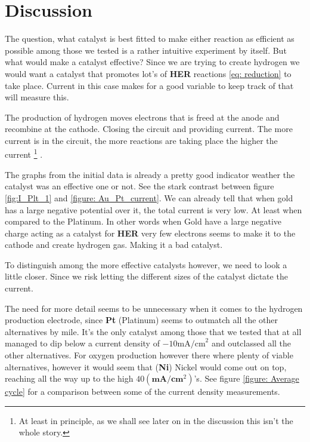 \documentclass[twocolumn, floatfix]{revtex4-2}
\begin{document}
\section{Discussion} 

The question, what catalyst is best fitted to make either reaction as efficient as 
possible among those we tested is a rather intuitive experiment by itself. But what 
would make a catalyst effective? Since we are trying to create hydrogen we would want a 
catalyst that promotes lot's of \textbf{HER} reactions \ref{eq: reduction} to take place. Current
in this case makes for a good variable to keep track of that will measure this. 
\par 
The production of hydrogen moves electrons that is freed at the anode and recombine
at the cathode. Closing the circuit and providing current. The more current is in the 
circuit, the more reactions are taking place the higher the current
\footnote{At least in principle, as we shall see later on in the discussion this isn't 
the whole story.}
.


The 
graphs from the initial data is already a pretty good indicator weather the catalyst
was an effective one or not. See the stark contrast between figure \ref{fig:I_Plt_1} and 
\ref{figure: Au_Pt_current}. We can already tell that when gold has a large negative 
potential over it, the total current is very low. At least when compared to the Platinum.
In other words when Gold have a large negative charge acting as a catalyst for \textbf{HER}
very few electrons seems to make it to the cathode and create hydrogen gas. Making it a 
bad catalyst. 
\par
To distinguish among the more effective catalysts however,
we need to look a little closer. Since we risk letting the different sizes 
of the catalyst dictate the current.
\par 
The need for more detail seems to be unnecessary when it comes to the hydrogen production
electrode, since \textbf{Pt} (Platinum) seems to outmatch all the other alternatives by mile.
It's the only catalyst among those that we tested that at all managed to dip below a current
density of $ - 10\text{mA/cm} ^2$ and outclassed all the other alternatives. For oxygen production 
however there where plenty of viable alternatives, however it would seem that (\textbf{Ni}) Nickel would 
come out on top, reaching all the way up to the high $40(\textbf{mA}/\textbf{cm}^2)$'s. See figure
\ref{figure: Average cycle} for a comparison between some of the current density measurements.
\end{document}
